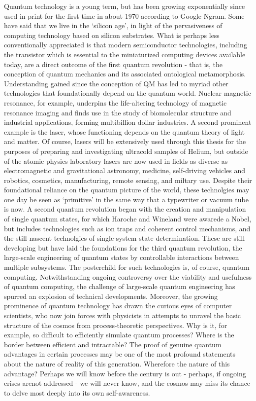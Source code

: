 Quantum technology is a young term, but has been growing exponentially
since used in print for the first time in about 1970 according to Google
Ngram.
	Some have said that we live in the `silicon age', in light of the
pervasiveness of computing technology based on silicon substrates.
	What
is perhaps less conventionally appreciated is that modern semiconductor
technologies, including the transistor which is essential to the
miniaturized computing devices available today, are a direct outcome of
the first quantum revolution - that is, the conception of quantum
mechanics and its associated ontological metamorphosis.
	Understanding
gained since the conception of QM has led to myriad other technologies
that foundationally depend on the quantum world.
	Nuclear magnetic
resonance, for example, underpins the life-altering technology of
magnetic resonance imaging and finds use in the study of biomolecular
structure and industrial applications, forming multibillion dollar
industries.
	A second prominent example is the laser, whose functioning
depends on the quantum theory of light and matter.
	Of course, lasers
will be extensively used through this thesis for the purposes of
preparing and investigating ultracold samples of Helium, but outside of
the atomic physics laboratory lasers are now used in fields as diverse
as electromagnetic and gravitational astronomy, medicine, self-driving
vehicles and robotics, cosmetics, manufacturing, remote sensing, and
miltary use.
	Despite their foundational reliance on the quantum picture
of the world, these technolgies may one day be seen as `primitive' in
the same way that a typewriter or vacuum tube is now.
	A second quantum
revolution began with the creation and manipulation of single quantum
states, for which Haroche and Wineland were awarede a Nobel, but
includes technologies such as ion traps and coherent control mechanisms,
and the still nascent technolgies of single-system state determination.
These are still developing but have laid the foundations for the third
quantum revolution, the large-scale engineering of quantum states by
controllable interactions between multiple subsystems.
	The posterchild
for such technologies is, of course, quantum computing.
	Notwithstanding
ongoing controversy over the viability and usefulness of quantum
computing, the challenge of large-scale quantum engineering has spurred
an explosion of technical developments.
	Moreover, the growing prominence
of quantum technology has drawn the curious eyes of computer scientists,
who now join forces with physicists in attempts to unravel the basic
structure of the cosmos from process-theoretic perspectives.
	Why is it,
for example, so difficult to efficiently simulate quantum processes?
Where is the border between efficient and intractable? The proof of
genuine quantum advantages in certain processes may be one of the most
profound statements about the nature of reality of this generation.
Wherefore the nature of this advantage? Perhaps we will know before the
century is out - perhaps, if ongoing crises arenot addressed - we will
never know, and the cosmos may miss its chance to delve most deeply into
its own self-awareness.

